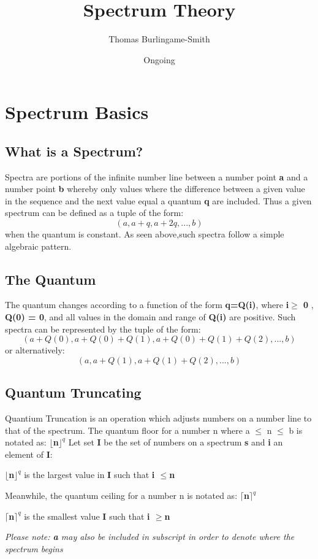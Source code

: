 \documentclass[12pt]{scrreprt}
\title{Spectrum Theory}
\author{Thomas Burlingame-Smith}
\date{Ongoing}
\begin{document}
\maketitle
\chapter{Spectrum Basics}
\section{What is a Spectrum?}
          Spectra are portions of the infinite number line between a number point \textbf{a} and a number point \textbf{b} whereby only values where the difference between a given value in the sequence and the next value equal a quantum \textbf{q} are included.
Thus a given spectrum can be defined as a tuple of the form:
                                                                                            \begin{equation}  (a,a+q,a+2q,...,b)\end{equation}
when the quantum is constant. As seen above,such spectra follow a simple algebraic pattern.  
\section{The Quantum}
	The quantum changes according to a function of the form \textbf{q=Q(i)}, where\textbf{ i$ \geq$ 0} ,\textbf{ Q(0) = 0}, and all values in the domain and range of \textbf{Q(i)} are positive. Such spectra can be represented by the tuple of the form:
                                                                                                   \begin{equation}  (a+Q(0),a+Q(0)+Q(1),a+Q(0)+Q(1)+Q(2),...,b)\end{equation}
or alternatively:
                                                                                                    \begin{equation}  (a,a+Q(1),a+Q(1)+Q(2),...,b)\end{equation}
\section{Quantum Truncating}
Quantium Truncation is an operation which adjusts numbers on a number line to that of the spectrum. 
The quantum floor for a number n where a $\leq$ n $\leq$ b is notated as: \textbf{$\lfloor$n$\rfloor^q$}\newline
Let set \textbf{I} be the set of numbers on a spectrum \textbf{s} and \textbf{i} an element of \textbf{I}:\begin{center}  \textbf{$\lfloor$n$\rfloor^q $} is the largest value in \textbf{I}  such that \textbf{i $\leq$n}\end{center}
Meanwhile, the quantum ceiling for a number n is notated as: \textbf{$\lceil$n$\rceil^q$}\\
\begin{center} \textbf{$\lceil$n$\rceil^q $} is the smallest value  \textbf{I} such that \textbf{i $\geq$n}
\end{center}
\textit{Please note: \textbf{a} may also be included in subscript in order to denote where the spectrum begins}
\end{document}
